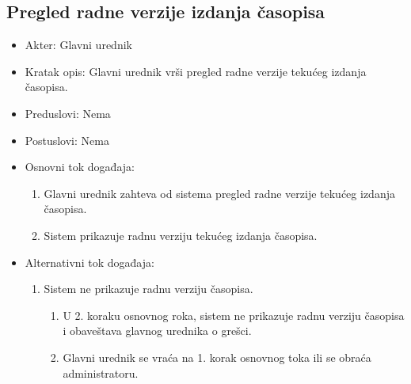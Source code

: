 \documentclass[a4paper]{article}
\begin{document}
\subsection{Pregled radne verzije izdanja časopisa}
\begin{itemize}
    \item Akter: Glavni urednik
    \item Kratak opis: Glavni urednik vrši pregled radne verzije tekućeg izdanja časopisa.
    \item Preduslovi: Nema
    \item Postuslovi: Nema
    \item Osnovni tok događaja:
        \begin{enumerate}
            \item Glavni urednik zahteva od sistema pregled radne verzije tekućeg izdanja časopisa.
            \item Sistem prikazuje radnu verziju tekućeg izdanja časopisa.
        \end{enumerate}
    \item Alternativni tok događaja:
        \begin{enumerate}
            \item Sistem ne prikazuje radnu verziju časopisa.
            \begin{enumerate}
                \item U 2. koraku osnovnog roka, sistem ne prikazuje radnu verziju časopisa i obaveštava glavnog urednika o grešci.
                \item Glavni urednik se vraća na 1. korak osnovnog toka ili se obraća administratoru.
            \end{enumerate}
        \end{enumerate}
\end{itemize}
\end{document}
